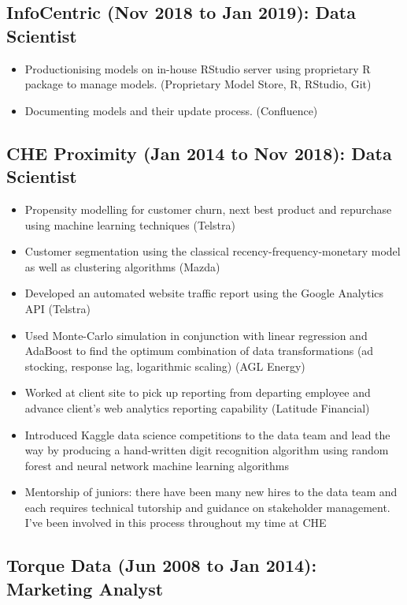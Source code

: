 \documentclass{moderncv}
\begin{document}
\subsection{InfoCentric (Nov 2018 to Jan 2019): Data Scientist}
\begin{itemize}
    \item Productionising models on in-house RStudio server using proprietary R package to manage models. (Proprietary Model Store, R, RStudio, Git)
    \item Documenting models and their update process. (Confluence)
\end{itemize}

\subsection{CHE Proximity (Jan 2014 to Nov 2018): Data Scientist}

\begin{itemize}
    \item Propensity modelling for customer churn, next best product and repurchase using machine learning techniques (Telstra)
    \item Customer segmentation using the classical recency-frequency-monetary model as well as clustering algorithms (Mazda)
    \item Developed an automated website traffic report using the Google Analytics API (Telstra)
    \item Used Monte-Carlo simulation in conjunction with linear regression and AdaBoost to find the optimum combination of data transformations (ad stocking, response lag, logarithmic scaling) (AGL Energy)
    \item Worked at client site to pick up reporting from departing employee and advance client's web analytics reporting capability (Latitude Financial)
    \item Introduced Kaggle data science competitions to the data team and lead the way by producing a hand-written digit recognition algorithm using random forest and neural network machine learning algorithms
    \item Mentorship of juniors: there have been many new hires to the data team and each requires technical tutorship and guidance on stakeholder management. I've been involved in this process throughout my time at CHE
\end{itemize}

\subsection{Torque Data (Jun 2008 to Jan 2014): Marketing Analyst}
\end{document}
